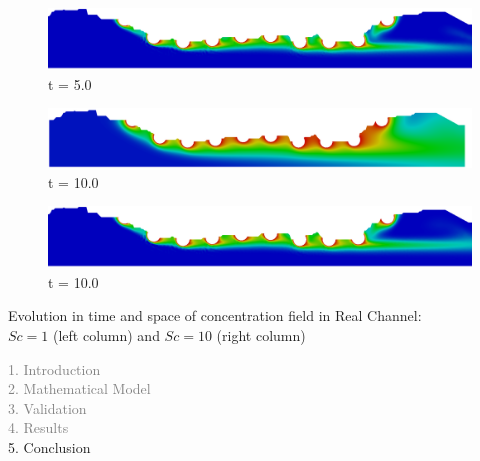 \begin{frame}
\begin{figure}
\begin{minipage}{.50\linewidth}
     \medskip
      \centering
      \includegraphics[scale=0.075]{images/conc10_RealStrut25000.png}\\
      \tiny t = 5.0
     \end{minipage}
     \begin{minipage}{.50\linewidth}
      \centering
      \includegraphics[scale=0.075]{images/conc1_RealStrut20000.png}\\
      \tiny t = 10.0
     \end{minipage}%
     \begin{minipage}{.50\linewidth}
      \centering
      \includegraphics[scale=0.075]{images/conc10_RealStrut50000.png}\\
      \tiny t = 10.0
     \end{minipage}
\end{figure}
\vspace{-0.2cm}
\centering \scriptsize Evolution in time and space of concentration field in Real Channel:\\
                 $Sc=1$ (left column) and $Sc=10$ (right column)
\end{frame}



\begin{frame}
  \vspace{-1cm}
  \textcolor{gray}{1. Introduction}\\[0.1cm]
  \textcolor{gray}{2. Mathematical Model}\\[0.1cm]
  \textcolor{gray}{3. Validation}\\[0.1cm]
  \textcolor{gray}{4. Results}\\[0.1cm]
  5. Conclusion
\end{frame}


